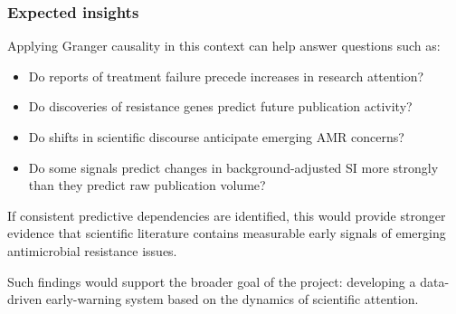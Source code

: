 \documentclass[
]{article}
\providecommand{\tightlist}{%
  \setlength{\itemsep}{0pt}\setlength{\parskip}{0pt}}
\begin{document}
\subsubsection{Expected insights}\label{58-expected-insights}

Applying Granger causality in this context can help answer questions
such as:

\begin{itemize}
\tightlist
\item
  Do reports of treatment failure precede increases in research
  attention?
\item
  Do discoveries of resistance genes predict future publication
  activity?
\item
  Do shifts in scientific discourse anticipate emerging AMR concerns?
\item
  Do some signals predict changes in background-adjusted SI more
  strongly than they predict raw publication volume?
\end{itemize}

If consistent predictive dependencies are identified, this would provide
stronger evidence that scientific literature contains measurable early
signals of emerging antimicrobial resistance issues.

Such findings would support the broader goal of the project: developing
a data-driven early-warning system based on the dynamics of scientific
attention.



\appendix
\clearpage

\end{document}
